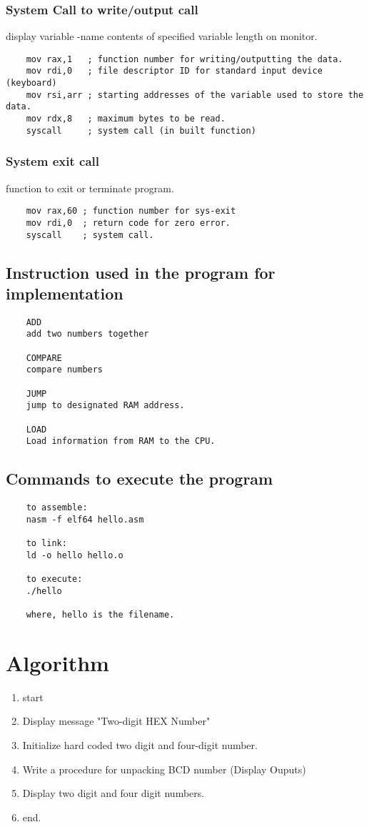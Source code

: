 \documentclass[11pt]{article}
\begin{document}
\subsubsection{\textbf{System Call to write/output call}}
display variable -name contents of specified variable length on monitor.
\begin{verbatim}
    mov rax,1   ; function number for writing/outputting the data.
    mov rdi,0   ; file descriptor ID for standard input device (keyboard)
    mov rsi,arr ; starting addresses of the variable used to store the data.
    mov rdx,8   ; maximum bytes to be read.
    syscall     ; system call (in built function)
\end{verbatim}
\subsubsection{\textbf{System exit call}}

function to exit or terminate program.
\begin{verbatim}
    mov rax,60 ; function number for sys-exit
    mov rdi,0  ; return code for zero error.
    syscall    ; system call.
\end{verbatim}
\subsection{\textbf{Instruction used in the program for implementation}}
\begin{verbatim}
    ADD
    add two numbers together

    COMPARE
    compare numbers

    JUMP
    jump to designated RAM address.

    LOAD 
    Load information from RAM to the CPU.
\end{verbatim}

\subsection{\textbf{Commands to execute the program}}
\begin{verbatim}
    to assemble:
    nasm -f elf64 hello.asm

    to link:
    ld -o hello hello.o

    to execute:
    ./hello

    where, hello is the filename.
\end{verbatim}

\section{\textbf{Algorithm}}
\begin{enumerate}
    \item start
    \item Display message "Two-digit HEX Number"
    \item Initialize hard coded two digit and four-digit number.
    \item Write a procedure for unpacking BCD number (Display Ouputs)
    \item Display two digit and four digit numbers.
    \item end.
\end{enumerate}
\end{document}
